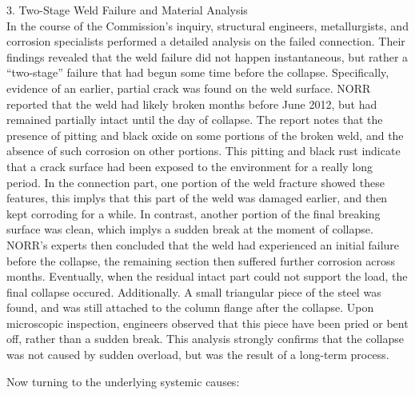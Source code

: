 \documentclass[12pt]{article}
\begin{document}
3. Two-Stage Weld Failure and Material Analysis \\
In the course of the Commission’s inquiry, structural engineers, metallurgists, and corrosion specialists performed a detailed analysis on the failed connection. Their findings revealed that the weld failure did not happen instantaneous, but rather a “two-stage” failure that had begun some time before the collapse. Specifically, evidence of an earlier, partial crack was found on the weld surface. NORR reported that the weld had likely broken months before June 2012, but had remained partially intact until the day of collapse.
The report notes that the presence of pitting and black oxide on some portions of the broken weld, and the absence of such corrosion on other portions. This pitting and black rust indicate that a crack surface had been exposed to the environment for a really long period. In the connection part, one portion of the weld fracture showed these features, this implys that this part of the weld was damaged earlier, and then kept corroding for a while. In contrast, another portion of the final breaking surface was clean, which implys a sudden break at the moment of collapse. NORR’s experts then concluded that the weld had experienced an initial failure before the collapse, the remaining section then suffered further corrosion across months. Eventually, when the residual intact part  could not support the load, the final collapse occured.
Additionally. A small triangular piece of the steel was found, and was still attached to the column flange after the collapse. Upon microscopic inspection, engineers observed that this piece have been pried or bent off, rather than a sudden break. This analysis strongly confirms that the collapse was not caused by sudden overload, but was the result of a long-term process.




Now turning to the underlying systemic causes:
\end{document}
